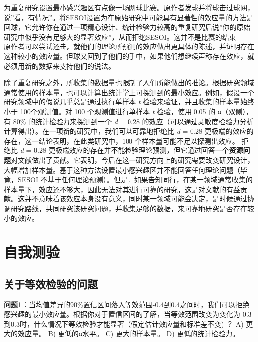 \documentclass[
  letterpaper,
  DIV=11,
  numbers=noendperiod]{scrreprt}
\begin{document}
为重复研究设置最小感兴趣区有点像一场网球比赛。原作者发球并将球击过球网，说''看，有情况''。将SESOI设置为在原始研究中可能具有显著性的效应量的方法是回球，它允许你在通过一项精心设计、统计检验力较高的重复研究后说''你的原始研究中似乎没有足够大的显著效应''，从而拒绝SESOI。这并不是比赛的结束------原作者可以尝试还击，就他们的理论所预测的效应做出更具体的陈述，并证明存在这种较小的效应量。但球又回到了他们的手中，如果他们想继续声称存在效应，就必须用新的数据来支持他们的说法。

除了重复研究之外，所收集的数据量也限制了人们所能做出的推论。根据研究领域通常使用的样本量，也可以计算出统计学上可探测到的最小效应。例如，假设一个研究领域中的假说几乎总是通过执行单样本
\emph{t} 检验来验证，并且收集的样本量始终小于 100个观测值。对 100
个观测值进行单样本 \emph{t} 检验，使用 0.05 的 α（双侧），有 80\%
的统计检验力来探测到一个 \emph{d} = 0.28
的效应（可以通过灵敏度检验力分析计算得出）。在一项新的研究中，我们可以可靠地拒绝比
\emph{d} = 0.28 更极端的效应的存在，这一结论表明，在此类研究中，100
个样本量可能不足以探测出效应。 拒绝比 \emph{d} = 0.28
更极端效应的存在并不能检验理论预测，但它通过回答一个\textbf{资源问题}对文献做出了贡献。它表明，今后在这一研究方向上的研究需要改变研究设计，大幅增加样本量。基于这种方法设置最小感兴趣区并不能回答任何理论问题（毕竟，SESOI
不基于任何理论预测）。但是，如果告知同行，在某一领域通常收集的样本量下，效应还不够大，因此无法对其进行可靠的研究，这是对文献的有益贡献。这并不意味着该效应本身没有意义，同时某一领域可能会决定，是时候通过协调研究路线，共同研究该研究问题，并收集足够的数据，来可靠地研究是否存在较小的效应。

\hypertarget{ux81eaux6211ux6d4bux9a8c}{%
\section{自我测验}\label{ux81eaux6211ux6d4bux9a8c}}

\hypertarget{ux5173ux4e8eux7b49ux6548ux68c0ux9a8cux7684ux95eeux9898}{%
\subsection{关于等效检验的问题}\label{ux5173ux4e8eux7b49ux6548ux68c0ux9a8cux7684ux95eeux9898}}

\textbf{问题1}：当均值差异的90\%置信区间落入等效范围-0.4到0.4之间时，我们可以拒绝感兴趣的最小效应量。根据你对于置信区间的了解，当等效范围改变为变化为-0.3到0.3时，什么情况下等效检验才能显著（假定估计效应量和标准差不变)
？ A) 更大的效应量。 B) 更低的α水平。 C) 更大的样本量。 D)
更低的统计检验力。
\end{document}
